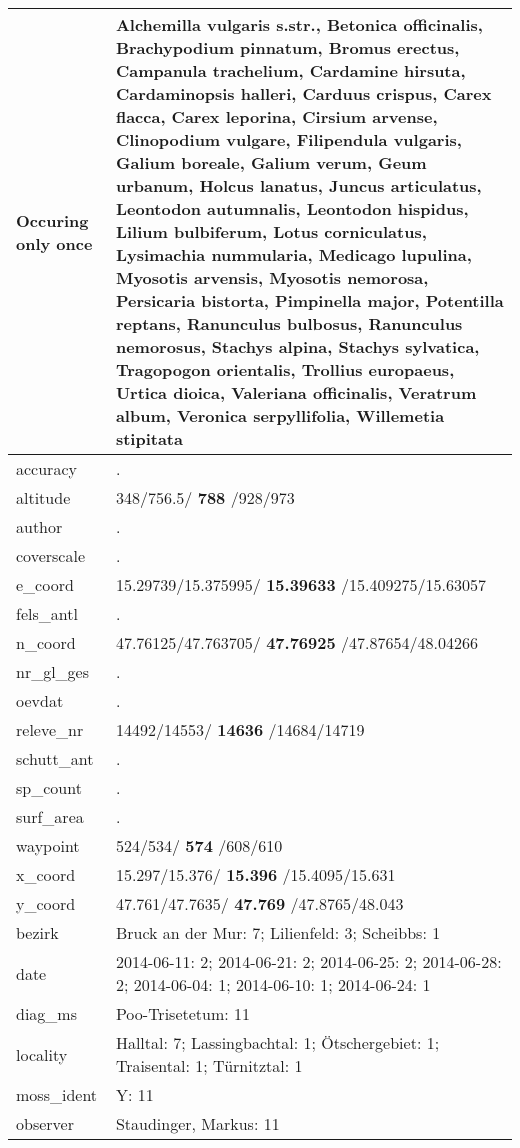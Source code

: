 \documentclass[9pt]{article}
\begin{document}
\begin{longtable}{lllllllllllllll}
\midrule
Occuring only once& \multicolumn{14}{p{150mm}}{Alchemilla vulgaris s.str., Betonica officinalis, Brachypodium pinnatum, Bromus erectus, Campanula trachelium, Cardamine hirsuta, Cardaminopsis halleri, Carduus crispus, Carex flacca, Carex leporina, Cirsium arvense, Clinopodium vulgare, Filipendula vulgaris, Galium boreale, Galium verum, Geum urbanum, Holcus lanatus, Juncus articulatus, Leontodon autumnalis, Leontodon hispidus, Lilium bulbiferum, Lotus corniculatus, Lysimachia nummularia, Medicago lupulina, Myosotis arvensis, Myosotis nemorosa, Persicaria bistorta, Pimpinella major, Potentilla reptans, Ranunculus bulbosus, Ranunculus nemorosus, Stachys alpina, Stachys sylvatica, Tragopogon orientalis, Trollius europaeus, Urtica dioica, Valeriana officinalis, Veratrum album, Veronica serpyllifolia, Willemetia stipitata}\tabularnewline
\midrule
accuracy& \multicolumn{14}{p{150mm}}{.}\tabularnewline
altitude& \multicolumn{14}{p{150mm}}{348/756.5/\textbf{ 788 }/928/973}\tabularnewline
author& \multicolumn{14}{p{150mm}}{.}\tabularnewline
coverscale& \multicolumn{14}{p{150mm}}{.}\tabularnewline
e_coord& \multicolumn{14}{p{150mm}}{15.29739/15.375995/\textbf{ 15.39633 }/15.409275/15.63057}\tabularnewline
fels_antl& \multicolumn{14}{p{150mm}}{.}\tabularnewline
n_coord& \multicolumn{14}{p{150mm}}{47.76125/47.763705/\textbf{ 47.76925 }/47.87654/48.04266}\tabularnewline
nr_gl_ges& \multicolumn{14}{p{150mm}}{.}\tabularnewline
oevdat& \multicolumn{14}{p{150mm}}{.}\tabularnewline
releve_nr& \multicolumn{14}{p{150mm}}{14492/14553/\textbf{ 14636 }/14684/14719}\tabularnewline
schutt_ant& \multicolumn{14}{p{150mm}}{.}\tabularnewline
sp_count& \multicolumn{14}{p{150mm}}{.}\tabularnewline
surf_area& \multicolumn{14}{p{150mm}}{.}\tabularnewline
waypoint& \multicolumn{14}{p{150mm}}{524/534/\textbf{ 574 }/608/610}\tabularnewline
x_coord& \multicolumn{14}{p{150mm}}{15.297/15.376/\textbf{ 15.396 }/15.4095/15.631}\tabularnewline
y_coord& \multicolumn{14}{p{150mm}}{47.761/47.7635/\textbf{ 47.769 }/47.8765/48.043}\tabularnewline
bezirk& \multicolumn{14}{p{150mm}}{Bruck an der Mur: 7; Lilienfeld: 3; Scheibbs: 1}\tabularnewline
date& \multicolumn{14}{p{150mm}}{2014-06-11: 2; 2014-06-21: 2; 2014-06-25: 2; 2014-06-28: 2; 2014-06-04: 1; 2014-06-10: 1; 2014-06-24: 1}\tabularnewline
diag_ms& \multicolumn{14}{p{150mm}}{Poo-Trisetetum: 11}\tabularnewline
locality& \multicolumn{14}{p{150mm}}{Halltal: 7; Lassingbachtal: 1; Ötschergebiet: 1; Traisental: 1; Türnitztal: 1}\tabularnewline
moss_ident& \multicolumn{14}{p{150mm}}{Y: 11}\tabularnewline
observer& \multicolumn{14}{p{150mm}}{Staudinger, Markus: 11}\tabularnewline

\end{longtable}
\end{document}
